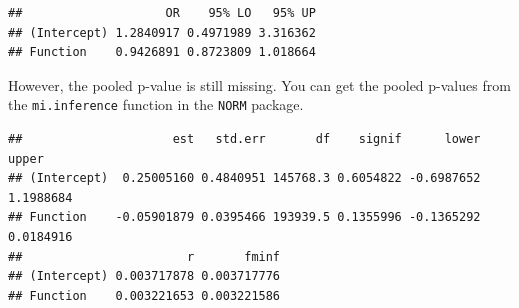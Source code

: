 \documentclass[
]{book}
\newenvironment{Shaded}{\begin{snugshade}}{\end{snugshade}}
\newcommand{\ControlFlowTok}[1]{\textcolor[rgb]{0.13,0.29,0.53}{\textbf{#1}}}
\newcommand{\DataTypeTok}[1]{\textcolor[rgb]{0.13,0.29,0.53}{#1}}
\newcommand{\DecValTok}[1]{\textcolor[rgb]{0.00,0.00,0.81}{#1}}
\newcommand{\KeywordTok}[1]{\textcolor[rgb]{0.13,0.29,0.53}{\textbf{#1}}}
\newcommand{\NormalTok}[1]{#1}
\newcommand{\OperatorTok}[1]{\textcolor[rgb]{0.81,0.36,0.00}{\textbf{#1}}}
\newcommand{\StringTok}[1]{\textcolor[rgb]{0.31,0.60,0.02}{#1}}
\begin{document}
\begin{verbatim}
##                    OR    95% LO   95% UP
## (Intercept) 1.2840917 0.4971989 3.316362
## Function    0.9426891 0.8723809 1.018664
\end{verbatim}

However, the pooled p-value is still missing. You can get the pooled p-values from the \texttt{mi.inference} function in the \texttt{NORM} package.

\begin{Shaded}
\end{Shaded}

\begin{verbatim}
##                     est   std.err       df    signif      lower     upper
## (Intercept)  0.25005160 0.4840951 145768.3 0.6054822 -0.6987652 1.1988684
## Function    -0.05901879 0.0395466 193939.5 0.1355996 -0.1365292 0.0184916
##                       r       fminf
## (Intercept) 0.003717878 0.003717776
## Function    0.003221653 0.003221586
\end{verbatim}

\begin{Shaded}
\end{Shaded}
\end{document}
